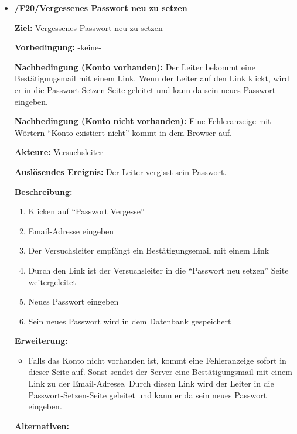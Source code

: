 \documentclass[a4paper]{scrreprt}
\begin{document}
\begin{itemize}
                \item \textbf{/F20/Vergessenes Passwort neu zu setzen}
    
                \par \textbf{Ziel: }Vergessenes Passwort neu zu setzen
                \par \textbf{Vorbedingung: }-keine-
                \par \textbf{Nachbedingung (Konto vorhanden): }Der Leiter bekommt eine Bestätigungsmail mit einem Link. Wenn der Leiter auf den Link klickt, wird er in die Passwort-Setzen-Seite geleitet und kann da sein neues Passwort eingeben.
                \par \textbf{Nachbedingung (Konto nicht vorhanden): }Eine Fehleranzeige mit Wörtern ``Konto existiert nicht'' kommt in dem Browser auf.
                \par \textbf{Akteure: }Versuchsleiter
                \par \textbf{Auslösendes Ereignis: }Der Leiter vergisst sein Passwort.
                \par \textbf{Beschreibung: }
                \begin{enumerate}
                    \item Klicken auf ``Passwort Vergesse''
                    \item Email-Adresse eingeben
                    \item Der Versuchsleiter empfängt ein Bestätigungsemail mit einem Link
                    \item Durch den Link ist der Versuchsleiter in die “Passwort neu setzen” Seite weitergeleitet
                    \item Neues Passwort eingeben
                    \item Sein neues Passwort wird in dem Datenbank gespeichert
                \end{enumerate}
                \par \textbf{Erweiterung: }
                \begin{itemize}
                    \item Falls das Konto nicht vorhanden ist, kommt eine Fehleranzeige sofort in dieser Seite auf. Sonst sendet der Server eine Bestätigungsmail mit einem Link zu der Email-Adresse. Durch diesen Link wird der Leiter in die Passwort-Setzen-Seite geleitet und kann er da sein neues Passwort eingeben.
                \end{itemize}
                \par \textbf{Alternativen: }
    

\end{itemize}
\end{document}
